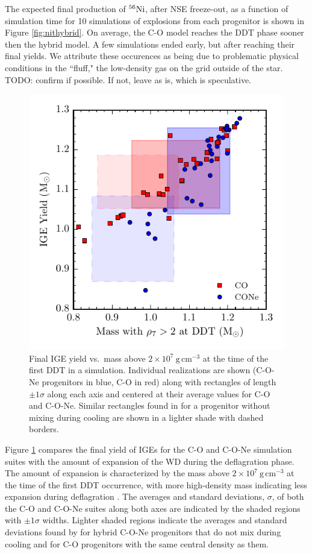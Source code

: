 \documentclass[iop,apj]{emulateapj}
\newcommand{\Ni}[1]{\ensuremath{{}^{#1}{\rm Ni}}}
\newcommand{\unitspace}{\ensuremath{\,}}
\newcommand{\usp}{\unitspace}
\newcommand{\unitstyle}[1]{\ensuremath{\mathrm{#1}}}
\newcommand{\power}[2]{\ensuremath{{#1}^{#2}}}
\newcommand{\centi}{\unitstyle{c}}
\newcommand{\meter}{\unitstyle{m}}
\newcommand{\cm}{\centi\meter}
\newcommand{\gram}{\unitstyle{g}}
\newcommand{\grampercc}{\gram\usp\power{\cm}{-3}} %
\begin{document}
The expected final production of \Ni{56}, after NSE freeze-out, as a function of simulation time
for 10 simulations of explosions from each progenitor is shown in Figure \ref{fig:nithybrid}.
On average, the C-O model reaches the DDT phase sooner then the
hybrid model.
A few simulations ended early, but after reaching their final yields. We attribute
these occurences as being due to problematic physical conditions in the ``fluff," the
low-density gas on the grid outside of the star. {\color{red}TODO: confirm if
possible. If not, leave as is, which is speculative.}

\begin{figure}
\includegraphics[width=\columnwidth]{figures/ige_v_mass_at_high_dens.pdf}
\caption{\label{fig:masshighdens}
Final IGE yield
vs.\ mass above $2\times 10^7~\grampercc$
at the time of the first DDT in a simulation.  Individual
realizations are shown (C-O-Ne
progenitors in blue, C-O in red) along with rectangles of length
$\pm 1 \sigma$ along each axis and centered at their average values
for C-O and C-O-Ne.  Similar rectangles found in \citet{willcoxetal2016} for a progenitor without
mixing during cooling are shown in a lighter shade with dashed borders.
}
\end{figure}

Figure \ref{fig:masshighdens} compares the final yield of IGEs
for the C-O and C-O-Ne simulation suites with the amount of expansion of the
WD during the deflagration phase. The amount of expansion is
characterized by the mass above $2 \times 10^7~\grampercc$ at the
time of the first DDT occurrence, with more high-density mass
indicating less expansion during deflagration \citep{townetal2009}.
The averages and standard deviations, $\sigma$, of both
the C-O and C-O-Ne suites along both axes are indicated by the shaded
regions with $\pm1\sigma$ widths.
Lighter shaded regions indicate the averages and standard deviations found by \citet{willcoxetal2016} for hybrid C-O-Ne progenitors that do not mix during cooling and for C-O progenitors with the same central density as them.
\end{document}
